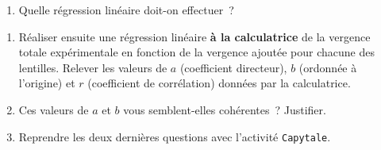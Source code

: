\documentclass[../main/main.tex]{subfiles}
\begin{document}
\begin{enumerate}[label=\clenumi, start=2]
	\item Quelle régression linéaire doit-on effectuer~?
\end{enumerate}

\begin{enumerate}[label=\sqenumi, start=5]
	\item Réaliser ensuite une régression linéaire \textbf{à la calculatrice} de
	      la vergence totale expérimentale en fonction de la vergence ajoutée pour
	      chacune des lentilles. Relever les valeurs de $a$ (coefficient
	      directeur), $b$ (ordonnée à l'origine) et $r$ (coefficient de
	      corrélation) données par la calculatrice.
	\item Ces valeurs de $a$ et $b$ vous semblent-elles cohérentes~? Justifier.
	\item Reprendre les deux dernières questions avec l'activité
	      \texttt{Capytale}.
\end{enumerate}
\end{document}

